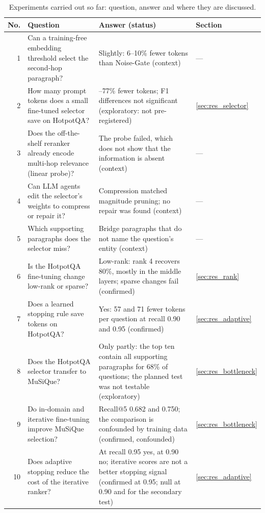 \begin{table}[htbp]
\centering
\caption{Experiments carried out so far: question, answer and where they are discussed.}
\label{tab:index}
\footnotesize
\begin{tabularx}{\textwidth}{@{}r>{\raggedright\arraybackslash}p{4.6cm}>{\raggedright\arraybackslash}Xl@{}}
\toprule
No. & Question & Answer (status) & Section \\
\midrule
1 & Can a training-free embedding threshold select the second-hop paragraph? & Slightly: 6--10\% fewer tokens than Noise-Gate (context) & --- \\
2 & How many prompt tokens does a small fine-tuned selector save on HotpotQA? & 68--77\% fewer tokens; F1 differences not significant (exploratory: not pre-registered) & \ref{sec:res_selector} \\
3 & Does the off-the-shelf reranker already encode multi-hop relevance (linear probe)? & The probe failed, which does not show that the information is absent (context) & --- \\
4 & Can LLM agents edit the selector's weights to compress or repair it? & Compression matched magnitude pruning; no repair was found (context) & --- \\
5 & Which supporting paragraphs does the selector miss? & Bridge paragraphs that do not name the question's entity (context) & --- \\
6 & Is the HotpotQA fine-tuning change low-rank or sparse? & Low-rank: rank 4 recovers 80\%, mostly in the middle layers; sparse changes fail (confirmed) & \ref{sec:res_rank} \\
7 & Does a learned stopping rule save tokens on HotpotQA? & Yes: 57 and 71 fewer tokens per question at recall 0.90 and 0.95 (confirmed) & \ref{sec:res_adaptive} \\
8 & Does the HotpotQA selector transfer to MuSiQue? & Only partly: the top ten contain all supporting paragraphs for 68\% of questions; the planned test was not testable (exploratory) & \ref{sec:res_bottleneck} \\
9 & Do in-domain and iterative fine-tuning improve MuSiQue selection? & Recall@5 0.682 and 0.750; the comparison is confounded by training data (confirmed, confounded) & \ref{sec:res_bottleneck} \\
10 & Does adaptive stopping reduce the cost of the iterative ranker? & At recall 0.95 yes, at 0.90 no; iterative scores are not a better stopping signal (confirmed at 0.95; null at 0.90 and for the secondary test) & \ref{sec:res_adaptive} \\

\end{tabularx}
\end{table}
